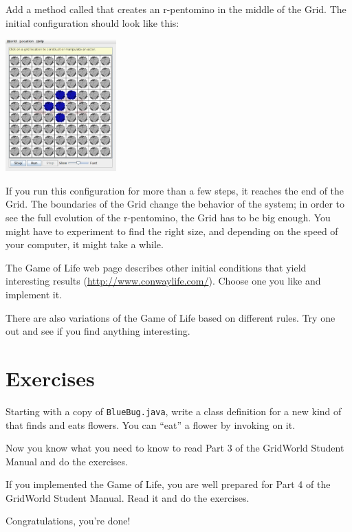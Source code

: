 Add a method called  that creates an r-pentomino in the middle of the Grid.
The initial configuration should look like this:

\begin{center}
\includegraphics[height=2in]{figs/LifeRunner.pdf}
\end{center}

If you run this configuration for more than a few steps, it reaches the end of the Grid.
The boundaries of the Grid change the behavior of the system; in order to see the full evolution of the r-pentomino, the Grid has to be big enough.
You might have to experiment to find the right size, and depending on the speed of your computer, it might take a while.

The Game of Life web page describes other initial conditions that yield interesting results (\url{http://www.conwaylife.com/}).
Choose one you like and implement it.

There are also variations of the Game of Life based on different rules.
Try one out and see if you find anything interesting.


\section{Exercises}


\begin{exercise}
Starting with a copy of {\tt BlueBug.java}, write a class definition for a new kind of  that finds and eats flowers.
You can ``eat'' a flower by invoking  on it.
\end{exercise}


\begin{exercise}
Now you know what you need to know to read Part 3 of the GridWorld Student Manual and do the exercises.
\end{exercise}


\begin{exercise}
If you implemented the Game of Life, you are well prepared for Part 4 of the GridWorld Student Manual.
Read it and do the exercises.
\end{exercise}


Congratulations, you're done!
